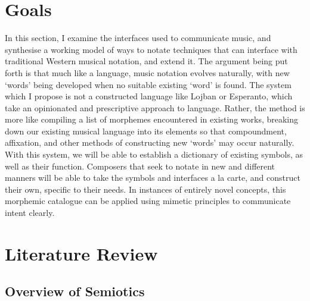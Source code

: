 
\renewcommand*{\thefootnote}{\arabic{footnote}}
\setcounter{footnote}{0}
\section{Goals}

In this section, I examine the interfaces used to communicate music, and synthesise a working model of ways to notate techniques that can interface with traditional Western musical notation, and extend it.
The argument being put forth is that much like a language, music notation evolves naturally, with new `words' being developed when no suitable existing `word' is found.
The system which I propose is not a constructed language like Lojban or Esperanto, which take an opinionated and prescriptive approach to language. 
Rather, the method is more like compiling a list of morphemes encountered in existing works, breaking down our existing musical language into its elements so that compoundment, affixation, and other methods of constructing new `words' may occur naturally.
With this system, we will be able to establish a dictionary of existing symbols, as well as their function.
Composers that seek to notate in new and different manners will be able to take the symbols and interfaces a la carte, and construct their own, specific to their needs.
In instances of entirely novel concepts, this morphemic catalogue can be applied using mimetic principles to communicate intent clearly.

\section{Literature Review}

\subsection{Overview of Semiotics}


